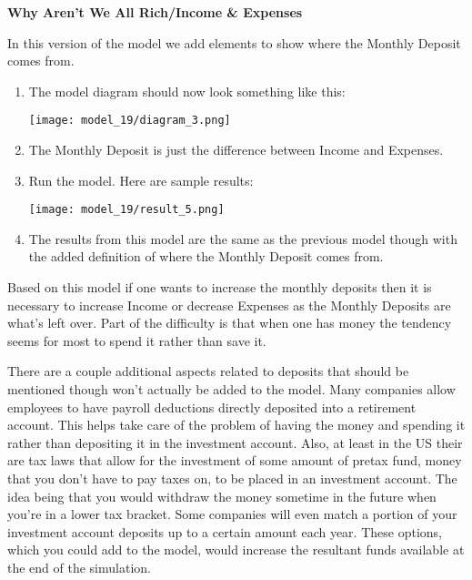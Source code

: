 \documentclass[]{memoir}
\makeatletter
\def\maxwidth{\ifdim\Gin@nat@width>\linewidth\linewidth
\else\Gin@nat@width\fi}
\let\Oldincludegraphics\includegraphics
\renewcommand{\includegraphics}[1]{\Oldincludegraphics[width=\maxwidth]{#1}}
\makeatother
\begin{document}
\begin{oframed}\textbf{Why Aren't We All Rich/Income \& Expenses} 

 In this version of the model we add elements to show where the Monthly Deposit comes from.

\begin{enumerate}
\item The model diagram should now look something like this: \par \begin{minipage}{\linewidth}  \centering \texttt{[image: model\_19/diagram\_3.png]}
\end{minipage}
\item 

The Monthly Deposit is just the difference between Income and Expenses.


\item Run the model. Here are sample results:\par \begin{minipage}{\linewidth}  \centering \texttt{[image: model\_19/result\_5.png]}
\end{minipage}
\item 

The results from this model are the same as the previous model though with the added definition of where the Monthly Deposit comes from.



\end{enumerate} \end{oframed}

Based on this model if one wants to increase the monthly deposits then
it is necessary to increase Income or decrease Expenses as the Monthly
Deposits are what's left over. Part of the difficulty is that when one
has money the tendency seems for most to spend it rather than save it.

There are a couple additional aspects related to deposits that should be
mentioned though won't actually be added to the model. Many companies
allow employees to have payroll deductions directly deposited into a
retirement account. This helps take care of the problem of having the
money and spending it rather than depositing it in the investment
account. Also, at least in the US their are tax laws that allow for the
investment of some amount of pretax fund, money that you don't have to
pay taxes on, to be placed in an investment account. The idea being that
you would withdraw the money sometime in the future when you're in a
lower tax bracket. Some companies will even match a portion of your
investment account deposits up to a certain amount each year. These
options, which you could add to the model, would increase the resultant
funds available at the end of the simulation.
\end{document}
